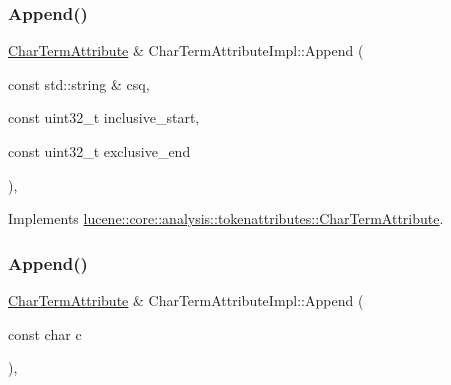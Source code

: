 \subsubsection{\texorpdfstring{Append()}{Append()}\hspace{0.1cm}{\footnotesize\ttfamily [2/4]}}
{\footnotesize\ttfamily \mbox{\hyperlink{classlucene_1_1core_1_1analysis_1_1tokenattributes_1_1CharTermAttribute}{Char\+Term\+Attribute}} \& Char\+Term\+Attribute\+Impl\+::\+Append (\begin{DoxyParamCaption}\item[{const std\+::string \&}]{csq,  }\item[{const uint32\+\_\+t}]{inclusive\+\_\+start,  }\item[{const uint32\+\_\+t}]{exclusive\+\_\+end }\end{DoxyParamCaption})\hspace{0.3cm}{\ttfamily [override]}, {\ttfamily [virtual]}}



Implements \mbox{\hyperlink{classlucene_1_1core_1_1analysis_1_1tokenattributes_1_1CharTermAttribute_a1fc0d3eaff550a10e8fc17a5e7bb98bc}{lucene\+::core\+::analysis\+::tokenattributes\+::\+Char\+Term\+Attribute}}.

\mbox{\label{classlucene_1_1core_1_1analysis_1_1tokenattributes_1_1CharTermAttributeImpl_a1f8dccf1ecc42396f7f97b6a1972325f}} 
\subsubsection{\texorpdfstring{Append()}{Append()}\hspace{0.1cm}{\footnotesize\ttfamily [3/4]}}
{\footnotesize\ttfamily \mbox{\hyperlink{classlucene_1_1core_1_1analysis_1_1tokenattributes_1_1CharTermAttribute}{Char\+Term\+Attribute}} \& Char\+Term\+Attribute\+Impl\+::\+Append (\begin{DoxyParamCaption}\item[{const char}]{c }\end{DoxyParamCaption})\hspace{0.3cm}{\ttfamily [override]}, {\ttfamily [virtual]}}



